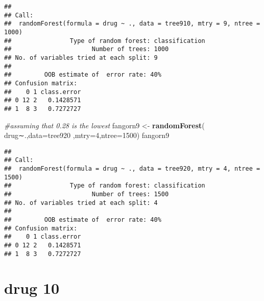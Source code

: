 \documentclass[]{article}
\newenvironment{Shaded}{\begin{snugshade}}{\end{snugshade}}
\newcommand{\KeywordTok}[1]{\textcolor[rgb]{0.13,0.29,0.53}{\textbf{#1}}}
\newcommand{\DataTypeTok}[1]{\textcolor[rgb]{0.13,0.29,0.53}{#1}}
\newcommand{\DecValTok}[1]{\textcolor[rgb]{0.00,0.00,0.81}{#1}}
\newcommand{\StringTok}[1]{\textcolor[rgb]{0.31,0.60,0.02}{#1}}
\newcommand{\CommentTok}[1]{\textcolor[rgb]{0.56,0.35,0.01}{\textit{#1}}}
\newcommand{\OperatorTok}[1]{\textcolor[rgb]{0.81,0.36,0.00}{\textbf{#1}}}
\newcommand{\NormalTok}[1]{#1}
\begin{document}
\begin{verbatim}
## 
## Call:
##  randomForest(formula = drug ~ ., data = tree910, mtry = 9, ntree = 1000) 
##                Type of random forest: classification
##                      Number of trees: 1000
## No. of variables tried at each split: 9
## 
##         OOB estimate of  error rate: 40%
## Confusion matrix:
##    0 1 class.error
## 0 12 2   0.1428571
## 1  8 3   0.7272727
\end{verbatim}

\begin{Shaded}
\begin{Highlighting}[]
\CommentTok{#assuming that 0.28 is the lowest}
\NormalTok{fangorn9 <-}\StringTok{ }\KeywordTok{randomForest}\NormalTok{( drug∼.,}\DataTypeTok{data=}\NormalTok{tree920  ,}\DataTypeTok{mtry=}\DecValTok{4}\NormalTok{,}\DataTypeTok{ntree=}\DecValTok{1500}\NormalTok{)}
\NormalTok{fangorn9}
\end{Highlighting}
\end{Shaded}

\begin{verbatim}
## 
## Call:
##  randomForest(formula = drug ~ ., data = tree920, mtry = 4, ntree = 1500) 
##                Type of random forest: classification
##                      Number of trees: 1500
## No. of variables tried at each split: 4
## 
##         OOB estimate of  error rate: 40%
## Confusion matrix:
##    0 1 class.error
## 0 12 2   0.1428571
## 1  8 3   0.7272727
\end{verbatim}

\section{drug 10}\label{drug-10}

\begin{Shaded}
\end{Shaded}
\end{document}
